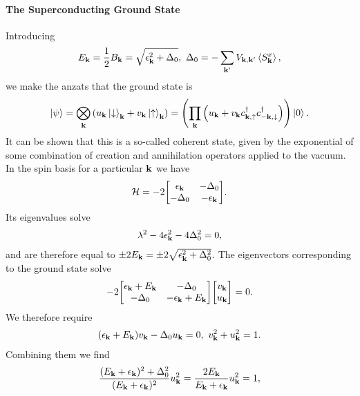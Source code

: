 \paragraph{The Superconducting Ground State}
Introducing
\begin{align*}
	E_{\vb{k}} = \frac{1}{2}B_{\vb{k}} = \sqrt{\epsilon_{\vb{k}}^{2} + \Delta_{0}},\ \Delta_{0} = -\sum\limits_{\vb{k}^{\prime}}V_{\vb{k}, \vb{k}^{\prime}}\expval{S_{\vb{k}}^{x}},
\end{align*}
we make the anzats that the ground state is
\begin{align*}
	\ket{\psi} = \bigotimes\limits_{\vb{k}}\left(u_{\vb{k}}\ket{\downarrow}_{\vb{k}} + v_{\vb{k}}\ket{\uparrow}_{\vb{k}}\right) = \left(\prod\limits_{\vb{k}}\left(u_{\vb{k}} + v_{\vb{k}}c_{\vb{k}, \uparrow}^{\dagger} c_{-\vb{k}, \downarrow}^{\dagger}\right)\right)\ket{0}.
\end{align*}
It can be shown that this is a so-called coherent state, given by the exponential of some combination of creation and annihilation operators applied to the vacuum. In the spin basis for a particular $\vb{k}$ we have
\begin{align*}
	\ham = -2\mqty[
		\epsilon_{\vb{k}}  & -\Delta_{0} \\
		-\Delta_{0}        & -\epsilon_{\vb{k}}
	].
\end{align*}
Its eigenvalues solve
\begin{align*}
	\lambda^{2} - 4\epsilon_{\vb{k}}^{2} - 4\Delta_{0}^{2} = 0,
\end{align*}
and are therefore equal to $\pm 2E_{\vb{k}} = \pm 2\sqrt{\epsilon_{\vb{k}}^{2} + \Delta_{0}^{2}}$. The eigenvectors corresponding to the ground state solve
\begin{align*}
	-2\mqty[
		\epsilon_{\vb{k}} + E_{\vb{k}} & -\Delta_{0} \\
		-\Delta_{0}                    & -\epsilon_{\vb{k}} + E_{\vb{k}}
	]\mqty[
		v_{\vb{k}} \\
		u_{\vb{k}}
	] = 0.
\end{align*}
We therefore require
\begin{align*}
	(\epsilon_{\vb{k}} + E_{\vb{k}})v_{\vb{k}} - \Delta_{0}u_{\vb{k}} = 0,\ v_{\vb{k}}^{2} + u_{\vb{k}}^{2} = 1.
\end{align*}
Combining them we find
\begin{align*}
	\frac{(E_{\vb{k}} + \epsilon_{\vb{k}})^{2} + \Delta_{0}^{2}}{(E_{\vb{k}} + \epsilon_{\vb{k}})^{2}}u_{\vb{k}}^{2} = \frac{2E_{\vb{k}}}{E_{\vb{k}} + \epsilon_{\vb{k}}}u_{\vb{k}}^{2} = 1,
\end{align*}
